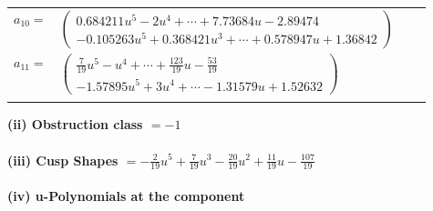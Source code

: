 \documentclass[1p]{elsarticle_modified}
\theoremstyle{definition}
\begin{document}
\begin{tabular}{m{7pt} m{180pt} m{7pt} m{180pt} }
\flushright $a_{10}=$&$\begin{pmatrix}0.684211 u^{5}-2 u^{4}+\cdots+7.73684 u-2.89474\\-0.105263 u^{5}+0.368421 u^{3}+\cdots+0.578947 u+1.36842\end{pmatrix}$ \\
\flushright $a_{11}=$&$\begin{pmatrix}\frac{7}{19} u^5- u^4+\cdots+\frac{123}{19} u-\frac{53}{19}\\-1.57895 u^{5}+3 u^{4}+\cdots-1.31579 u+1.52632\end{pmatrix}$\\&\end{tabular}
\flushleft \textbf{(ii) Obstruction class $= -1$}\\~\\
\flushleft \textbf{(iii) Cusp Shapes $= -\frac{2}{19} u^5+\frac{7}{19} u^3-\frac{20}{19} u^2+\frac{11}{19} u-\frac{107}{19}$}\\~\\
\newpage\renewcommand{\arraystretch}{1}
\flushleft \textbf{(iv) u-Polynomials at the component}\newline \\
\end{document}
